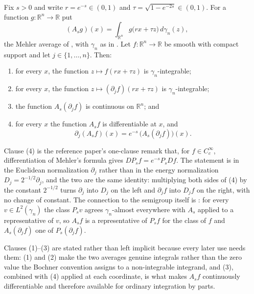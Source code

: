 \begin{lemma}[Differentiating Mehler's formula: $\partial_j P_s f = e^{-s}P_s(\partial_j f)$ on the smooth core]
Fix $s > 0$ and write $r = e^{-s} \in (0,1)$ and $\tau = \sqrt{1-e^{-2s}} \in (0,1)$.
For a function $g : \mathbb{R}^n \to \mathbb{R}$ put
\[
  (A_s g)(x) = \int_{\mathbb{R}^n} g\bigl(rx + \tau z\bigr) \, d\gamma_n(z),
\]
the Mehler average of , with $\gamma_n$ as in
.  Let $f : \mathbb{R}^n \to \mathbb{R}$ be smooth with
compact support and let $j \in \{1,\ldots,n\}$.  Then:
\begin{enumerate}
\item for every $x$, the function $z \mapsto f(rx+\tau z)$ is
$\gamma_n$-integrable;
\item for every $x$, the function $z \mapsto (\partial_j f)(rx+\tau z)$ is
$\gamma_n$-integrable;
\item the function $A_s(\partial_j f)$ is continuous on $\mathbb{R}^n$; and
\item for every $x$ the function $A_s f$ is differentiable at $x$, and
\[
  \partial_j (A_s f)(x) = e^{-s}\,\bigl(A_s(\partial_j f)\bigr)(x) .
\]
\end{enumerate}

Clause (4) is the reference paper's one-clause remark that, for
$f \in C_c^\infty$, differentiation of Mehler's formula gives
$DP_sf = e^{-s}P_s Df$.  The statement is in the Euclidean normalization
$\partial_j$ rather than in the energy normalization $D_j = 2^{-1/2}\partial_j$,
and the two are the same identity: multiplying both sides of (4) by the constant
$2^{-1/2}$ turns $\partial_j$ into $D_j$ on the left and $\partial_j f$ into
$D_j f$ on the right, with no change of constant.  The connection to the
semigroup itself is : for every $v \in L^2(\gamma_n)$ the
class $P_s v$ agrees $\gamma_n$-almost everywhere with $A_s$ applied to a
representative of $v$, so $A_s f$ is a representative of $P_s f$ for the class of
$f$ and $A_s(\partial_j f)$ one of $P_s(\partial_j f)$.

Clauses (1)--(3) are stated rather than left implicit because every later use
needs them: (1) and (2) make the two averages genuine integrals rather than the
zero value the Bochner convention assigns to a non-integrable integrand, and
(3), combined with (4) applied at each coordinate, is what makes $A_s f$
continuously differentiable and therefore available for ordinary integration by
parts.
\end{lemma}
